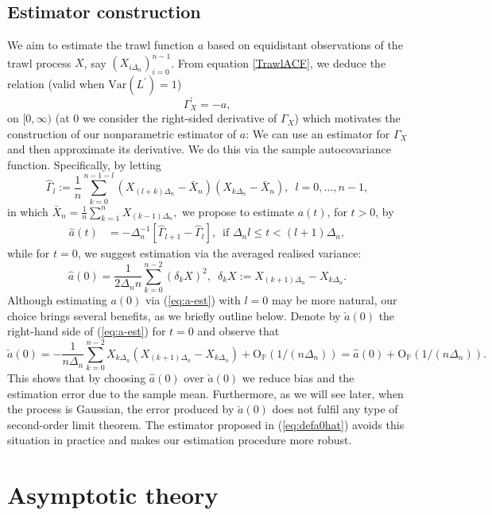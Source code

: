 \documentclass{article}
\theoremstyle{plain}
\theoremstyle{definition}
\theoremstyle{remark}
\newcommand{\Var}{\ensuremath{\mathrm{Var}}}
\begin{document}
\subsection{Estimator construction}
We aim to estimate the trawl function $a$ based on equidistant observations
of the trawl process $X$, say $(X_{i\Delta_{n}})_{i=0}^{n-1}$. From equation \eqref{TrawlACF}, we deduce the relation (valid when $\Var(L^{\prime})=1$)
\[
\varGamma_{X}^{\prime}=-a, 
\]
on $[0,\infty)$ (at $0$ we consider the right-sided derivative of $\varGamma_{X}$)  which motivates the construction of our nonparametric estimator of
$a$: We can use an estimator for $\varGamma_{X}$ and then approximate
its derivative. We do this via the sample autocovariance function.
Specifically, by letting 
\[
\hat{\varGamma}_{l}:=\frac{1}{n}\sum_{k=0}^{n-1-l}(X_{(l+k)\Delta_{n}}-\bar{X}_{n})(X_{k\Delta_{n}}-\bar{X}_{n}),\,\,\,l=0,\ldots,n-1,
\]
in which $\bar{X}_{n}=\frac{1}{n}\sum_{k=1}^{n}X_{(k-1)\Delta_{n}},$ we
propose to estimate $a(t)$, for $t>0$, by 
\begin{align}
	\hat{a}(t) & =-\Delta_{n}^{-1}\left[\hat{\varGamma}_{l+1}-\hat{\varGamma}_{l}\right],\,\,\,\text{if }\Delta_{n}l\leq t<(l+1)\Delta_{n},\label{eq:a-est}
\end{align}
while for $t=0$, we suggest estimation via the averaged realised variance:
\begin{equation}
	\hat{a}(0)=\frac{1}{2\Delta_{n}n}\sum_{k=0}^{n-2}(\delta_{k}X)^{2},\,\,\,\delta_{k}X:=X_{(k+1)\Delta_{n}}-X_{k\Delta_{n}}.\label{eq:defa0hat}
\end{equation}
Although estimating $a(0)$ via (\ref{eq:a-est}) with $l=0$ may be more natural, our choice brings several benefits, as we briefly outline below. Denote by $\check{a}(0)$ the right-hand side of (\ref{eq:a-est}) for $t=0$ and observe that
\begin{equation}
   \check{a}(0)=-\frac{1}{n\Delta_{n}}\sum_{k=0}^{n-2}X_{k\Delta_{n}}(X_{(k+1)\Delta_{n}}-X_{k\Delta_{n}})+\mathrm{O}_{\mathbb{P}}(1/(n\Delta_{n}))=\hat{a}(0)+\mathrm{O}_{\mathbb{P}}(1/(n\Delta_{n})).  \label{hata0_dec}
\end{equation}
This shows that by choosing $\hat{a}(0)$ over $\check{a}(0)$ we reduce bias and the estimation error due to the sample mean. Furthermore, as we will see later, when the process is Gaussian, the error produced by $\check{a}(0)$ does not fulfil any type of second-order limit theorem. The estimator proposed in (\ref{eq:defa0hat}) avoids this situation in practice and makes our estimation procedure more robust.
\section{Asymptotic theory}\label{sec:results}
\end{document}
